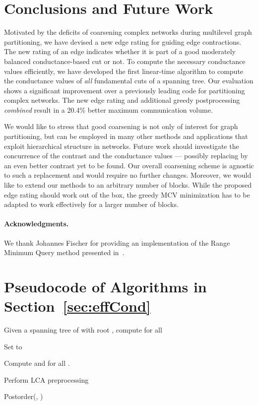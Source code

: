 \documentclass[pdftex]{llncs}
\numberwithin{equation}{section}
\numberwithin{example}{section}
\numberwithin{table}{section}
\begin{document}
\section{Conclusions and Future Work}
\label{sec:conclusions}
Motivated by the deficits of coarsening complex networks during
multilevel graph partitioning, we have devised a new edge rating for
guiding edge contractions. The new rating of an edge indicates whether
it is part of a good moderately balanced conductance-based cut or
not. To compute the necessary conductance values efficiently, we have
developed the first linear-time algorithm to compute the conductance
values of \emph{all} fundamental cuts of a spanning tree.
Our evaluation shows a significant improvement over a previously leading
code for partitioning complex networks. 
The new edge rating and additional greedy postprocessing \emph{combined}
result in a 20.4\% better maximum communication volume.

We would like to stress that good coarsening is not only of interest
for graph partitioning, but can be employed in many other methods and
applications that exploit hierarchical structure in networks. Future
work should investigate the concurrence of the contrast  and
the conductance values  --- possibly replacing  by an
even better contrast yet to be found. Our overall coarsening scheme is
agnostic to such a replacement and would require no further
changes. Moreover, we would like to extend our methods to an arbitrary
number of blocks. While the proposed edge rating should work out of
the box, the greedy MCV minimization has to be adapted to work
effectively for a larger number of blocks.




\paragraph*{Acknowledgments.}
We thank Johannes Fischer for providing an implementation of
the Range Minimum Query method presented in~\cite{Fischer2006a}.


\begin{footnotesize}


\end{footnotesize}


\newpage
\appendix
\section{Pseudocode of Algorithms in Section~\ref{sec:effCond}}
\label{sec:pseudocode}
\begin{algorithm}[!h]
\caption{Given a spanning tree  of  with root ,
  compute  for all }
\label{algo:BTE}
\begin{algorithmic}[1]
\State Set  to 

\State Compute  and  for all .

\State Perform LCA preprocessing

\State Postorder(, )
\end{algorithmic}
\end{algorithm}
\end{document}
